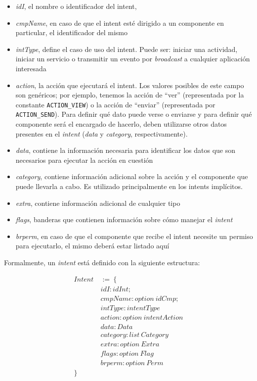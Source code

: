 \begin{itemize}
    \item \textit{idI}, el nombre o identificador del intent,
    \item \textit{cmpName}, en caso de que el intent esté dirigido a un componente en particular, el
          identificador del mismo
    \item \textit{intType}, define el caso de uso del intent. Puede ser: iniciar una actividad,
          iniciar un servicio o transmitir un evento por \textit{broadcast} a cualquier aplicación
          interesada
    \item \textit{action}, la acción que ejecutará el intent. Los valores posibles de este campo son
          genéricos; por ejemplo, tenemos la acción de ``ver'' (representada por la constante
          \texttt{ACTION\_VIEW}) o la acción de ``enviar'' (representada por \texttt{ACTION\_SEND}).
          Para definir qué dato puede verse o enviarse y para definir qué componente será el
          encargado de hacerlo, deben utilizarse otros datos presentes en el \textit{intent}
          (\textit{data} y \textit{category}, respectivamente).
    \item \textit{data}, contiene la información necesaria para identificar los datos que son
          necesarios para ejecutar la acción en cuestión
    \item \textit{category}, contiene información adicional sobre la acción y el componente que
          puede llevarla a cabo. Es utilizado principalmente en los intents implícitos.
    \item \textit{extra}, contiene información adicional de cualquier tipo
    \item \textit{flags}, banderas que contienen información sobre cómo manejar el \textit{intent}
    \item\textit{brperm}, en caso de que el componente que recibe el intent necesite un permiso para
          ejecutarlo, el mismo deberá estar listado aquí
\end{itemize}


Formalmente, un \textit{intent} está definido con la siguiente estructura:

\begin{align*}
    Intent\  & :=\ \{                       \\
             & idI: idInt;                  \\
             & cmpName: option\ idCmp;      \\
             & intType: intentType          \\
             & action: option\ intentAction \\
             & data: Data                   \\
             & category: list\ Category     \\
             & extra: option\ Extra         \\
             & flags: option\ Flag          \\
             & brperm: option\ Perm         \\
    \}
\end{align*}

